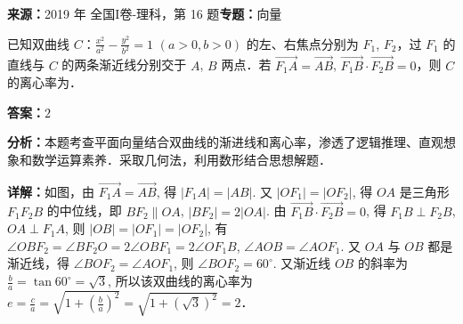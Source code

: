 \begin{question}[points=5]
\textbf{来源：}2019 年 全国I卷-理科，第 16 题\quad \textbf{专题：}向量\par
已知双曲线 $C$：$\frac{x^2}{a^2} - \frac{y^2}{b^2} = 1$ $(a > 0, b > 0)$ 的左、右焦点分别为 $F_1$, $F_2$，过 $F_1$ 的直线与 $C$ 的两条渐近线分别交于 $A$, $B$ 两点．若 $\overrightarrow{F_1A} = \overrightarrow{AB}$, $\overrightarrow{F_1B} \cdot \overrightarrow{F_2B} = 0$，则 $C$ 的离心率为．
\fillin[{$2$}]
\begin{solution}
\textbf{答案：}$2$

\textbf{分析：}本题考查平面向量结合双曲线的渐进线和离心率，渗透了逻辑推理、直观想象和数学运算素养．采取几何法，利用数形结合思想解题．

\textbf{详解：}如图，由 $\overrightarrow{F_1A} = \overrightarrow{AB}$, 得 $|F_1A| = |AB|$. 又 $|OF_1| = |OF_2|$, 得 $OA$ 是三角形 $F_1F_2B$ 的中位线，即 $BF_2 \parallel OA$, $|BF_2| = 2|OA|$. 由 $\overrightarrow{F_1B} \cdot \overrightarrow{F_2B} = 0$, 得 $F_1B \perp F_2B$, $OA \perp F_1A$, 则 $|OB| = |OF_1| = |OF_2|$, 有 $\angle OBF_2 = \angle BF_2O = 2\angle OBF_1 = 2\angle OF_1B$, $\angle AOB = \angle AOF_1$. 又 $OA$ 与 $OB$ 都是渐近线，得 $\angle BOF_2 = \angle AOF_1$, 则 $\angle BOF_2 = 60^\circ$. 又渐近线 $OB$ 的斜率为 $\frac{b}{a} = \tan 60^\circ = \sqrt{3}$, 所以该双曲线的离心率为 $e = \frac{c}{a} = \sqrt{1 + \left(\frac{b}{a}\right)^2} = \sqrt{1 + (\sqrt{3})^2} = 2$．
\end{solution}
\end{question}

